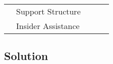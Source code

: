 \documentclass[a4paper]{article}
\begin{document}
\begin{table}[h!]
\begin{tabular}{|l|l|l|l|l|l|}
                                                  				& \multicolumn{2}{l|}{Support Structure}            		&                    &                   &                    				\\ \cline{2-6} 
                                                  				& \multicolumn{2}{l|}{Insider Assistance}           		&                    &                   &                    				\\ \hline
\end{tabular}
\end{table}

\subsection*{Solution}


\newpage
\end{document}
